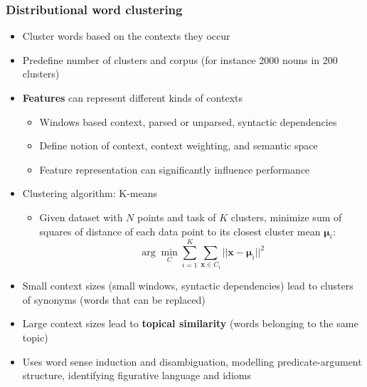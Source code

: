 \subsubsection{Distributional word clustering}
\begin{itemize}
	\item Cluster words based on the contexts they occur
	\item Predefine number of clusters and corpus (for instance 2000 nouns in 200 clusters)
	\item \textbf{Features} can represent different kinds of contexts
	\begin{itemize}
		\item Windows based context, parsed or unparsed, syntactic dependencies
		\item Define notion of context, context weighting, and semantic space 
		\item Feature representation can significantly influence performance
	\end{itemize}
	\item Clustering algorithm: K-means
	\begin{itemize}
		\item Given dataset with $N$ points and task of $K$ clusters, minimize sum of squares of distance of each data point to its closest cluster mean $\bm{\mu}_i$:
		$$\arg\min_C \sum\limits_{i=1}^{K}\sum\limits_{\bm{x}\in C_i} ||\bm{x} - \bm{\mu}_{i}||^2$$
	\end{itemize}
	\item Small context sizes (small windows, syntactic dependencies) lead to clusters of synonyms (words that can be replaced)
	\item Large context sizes lead to \textbf{topical similarity} (words belonging to the same topic)
	\item Uses word sense induction and disambiguation, modelling predicate-argument structure, identifying figurative language and idioms
\end{itemize}

